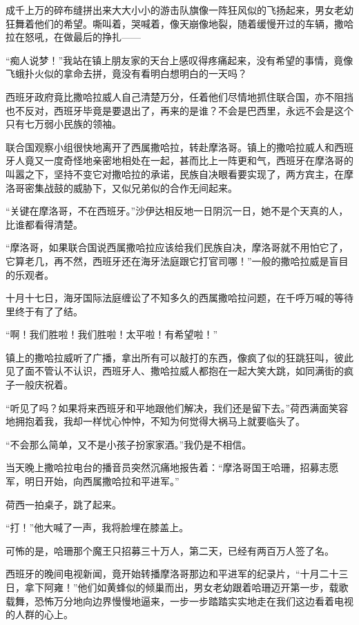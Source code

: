 \par 成千上万的碎布缝拼出来大大小小的游击队旗像一阵狂风似的飞扬起来，男女老幼狂舞着他们的希望。嘶叫着，哭喊着，像天崩像地裂，随着缓慢开过的车辆，撒哈拉在怒吼，在做最后的挣扎——
\par “痴人说梦！”我站在镇上朋友家的天台上感叹得疼痛起来，没有希望的事情，竟像飞蛾扑火似的拿命去拼，竟没有看明白想明白的一天吗？
\par 西班牙政府竟比撒哈拉威人自己清楚万分，任着他们尽情地抓住联合国，亦不阻挡也不反对，西班牙毕竟是要退出了，再来的是谁？不会是巴西里，永远不会是这个只有七万弱小民族的领袖。
\par 联合国观察小组很快地离开了西属撒哈拉，转赴摩洛哥。镇上的撒哈拉威人和西班牙人竟又一度奇怪地亲密地相处在一起，甚而比上一阵更和气，西班牙在摩洛哥的叫嚣之下，坚持不变它对撒哈拉的承诺，民族自决眼看要实现了，两方宾主，在摩洛哥密集战鼓的威胁下，又似兄弟似的合作无间起来。
\par “关键在摩洛哥，不在西班牙。”沙伊达相反地一日阴沉一日，她不是个天真的人，比谁都看得清楚。
\par “摩洛哥，如果联合国说西属撒哈拉应该给我们民族自决，摩洛哥就不用怕它了，它算老几，再不然，西班牙还在海牙法庭跟它打官司哪！”一般的撒哈拉威是盲目的乐观者。
\par 十月十七日，海牙国际法庭缠讼了不知多久的西属撒哈拉问题，在千呼万喊的等待里终于有了了结。
\par “啊！我们胜啦！我们胜啦！太平啦！有希望啦！”
\par 镇上的撒哈拉威听了广播，拿出所有可以敲打的东西，像疯了似的狂跳狂叫，彼此见了面不管认不认识，西班牙人、撒哈拉威人都抱在一起大笑大跳，如同满街的疯子一般庆祝着。
\par “听见了吗？如果将来西班牙和平地跟他们解决，我们还是留下去。”荷西满面笑容地拥抱着我，我却一样忧心忡忡，不知为何觉得大祸马上就要临头了。
\par “不会那么简单，又不是小孩子扮家家酒。”我仍是不相信。
\par 当天晚上撒哈拉电台的播音员突然沉痛地报告着：“摩洛哥国王哈珊，招募志愿军，明日开始，向西属撒哈拉和平进军。”
\par 荷西一拍桌子，跳了起来。
\par “打！”他大喊了一声，我将脸埋在膝盖上。
\par 可怖的是，哈珊那个魔王只招募三十万人，第二天，已经有两百万人签了名。
\par 西班牙的晚间电视新闻，竟开始转播摩洛哥那边和平进军的纪录片，“十月二十三日，拿下阿雍！”他们如黄蜂似的倾巢而出，男女老幼跟着哈珊迈开第一步，载歌载舞，恐怖万分地向边界慢慢地逼来，一步一步踏踏实实地走在我们这边看着电视的人群的心上。
